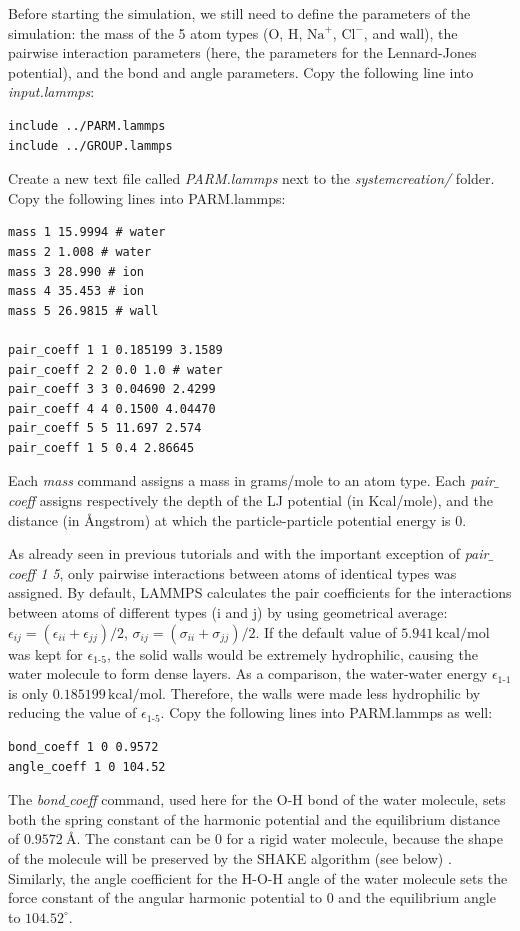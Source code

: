 \documentclass[9pt,tutorial]{livecoms}
\begin{document}
Before starting the simulation, we still need to define the parameters of the simulation: the mass of the 5 atom types (O, H, $\text{Na}^+$, $\text{Cl}^-$, and wall), the pairwise interaction parameters (here, the parameters for the Lennard-Jones potential), and the bond and angle parameters. Copy the following line into \textit{input.lammps}:
{\normalsize \begin{verbatim}
include ../PARM.lammps
include ../GROUP.lammps
\end{verbatim}}
Create a new text file called \textit{PARM.lammps} next to the \textit{systemcreation/} folder. Copy the following lines into PARM.lammps:
{\normalsize \begin{verbatim}
mass 1 15.9994 # water
mass 2 1.008 # water
mass 3 28.990 # ion
mass 4 35.453 # ion
mass 5 26.9815 # wall

pair_coeff 1 1 0.185199 3.1589 
pair_coeff 2 2 0.0 1.0 # water
pair_coeff 3 3 0.04690 2.4299
pair_coeff 4 4 0.1500 4.04470
pair_coeff 5 5 11.697 2.574
pair_coeff 1 5 0.4 2.86645
\end{verbatim}}
Each \textit{mass} command assigns a mass in grams/mole to an atom type. Each \textit{pair$\_$coeff} assigns respectively the depth of the LJ potential (in Kcal/mole), and the distance (in Ångstrom) at which the particle-particle potential energy is 0.

As already seen in previous tutorials and with the important exception of \textit{pair$\_$coeff 1 5}, only pairwise interactions between atoms of identical types was assigned. By default, LAMMPS calculates the pair coefficients for the interactions between atoms of different types (i and j) by using geometrical average: $\epsilon_{ij} = (\epsilon_{ii} + \epsilon_{jj})/2$,  $\sigma_{ij} = (\sigma_{ii} + \sigma_{jj})/2$. If the default value of $5.941\,\text{kcal/mol}$ was kept for $\epsilon_\text{1-5}$, the solid walls would be extremely hydrophilic, causing the water molecule to form dense layers. As a comparison, the water-water energy $\epsilon_\text{1-1}$ is only $0.185199\,\text{kcal/mol}$. Therefore, the walls were made less hydrophilic by reducing the value of $\epsilon_\text{1-5}$. Copy the following lines into PARM.lammps as well:
{\normalsize \begin{verbatim}   
bond_coeff 1 0 0.9572
angle_coeff 1 0 104.52
\end{verbatim}}
The \textit{bond$\_$coeff} command, used here for the O-H bond of the water molecule, sets both the spring constant of the harmonic potential and the equilibrium distance of $0.9572~\text{Å}$. The constant can be 0 for a rigid water molecule, because the shape of the molecule will be preserved by the SHAKE algorithm (see below) \cite{ryckaert1977numerical, andersen1983rattle}. Similarly, the angle coefficient for the H-O-H angle of the water molecule sets the force constant of the angular harmonic potential to 0 and the equilibrium angle to $104.52^\circ$.
\end{document}
